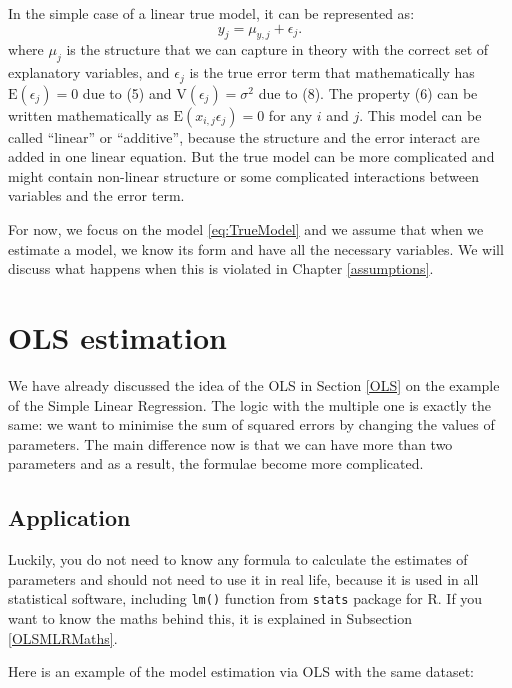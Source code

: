 \documentclass[
]{book}
\theoremstyle{definition}
\theoremstyle{definition}
\theoremstyle{definition}
\theoremstyle{definition}
\theoremstyle{remark}
\begin{document}
In the simple case of a linear true model, it can be represented as:
\begin{equation}
    y_j = \mu_{y,j} + \epsilon_j .
    \label{eq:TrueModel}
\end{equation}
where \(\mu_j\) is the structure that we can capture in theory with the correct set of explanatory variables, and \(\epsilon_j\) is the true error term that mathematically has \(\mathrm{E}(\epsilon_j)=0\) due to (5) and \(\mathrm{V}(\epsilon_j)=\sigma^2\) due to (8). The property (6) can be written mathematically as \(\mathrm{E}(x_{i,j}\epsilon_j)=0\) for any \(i\) and \(j\). This model can be called ``linear'' or ``additive'', because the structure and the error interact are added in one linear equation. But the true model can be more complicated and might contain non-linear structure or some complicated interactions between variables and the error term.

For now, we focus on the model \eqref{eq:TrueModel} and we assume that when we estimate a model, we know its form and have all the necessary variables. We will discuss what happens when this is violated in Chapter \ref{assumptions}.

\section{OLS estimation}\label{OLSMLR}

We have already discussed the idea of the OLS in Section \ref{OLS} on the example of the Simple Linear Regression. The logic with the multiple one is exactly the same: we want to minimise the sum of squared errors by changing the values of parameters. The main difference now is that we can have more than two parameters and as a result, the formulae become more complicated.

\subsection{Application}\label{application}

Luckily, you do not need to know any formula to calculate the estimates of parameters and should not need to use it in real life, because it is used in all statistical software, including \texttt{lm()} function from \texttt{stats} package for R. If you want to know the maths behind this, it is explained in Subsection \ref{OLSMLRMaths}.

Here is an example of the model estimation via OLS with the same dataset:
\end{document}

